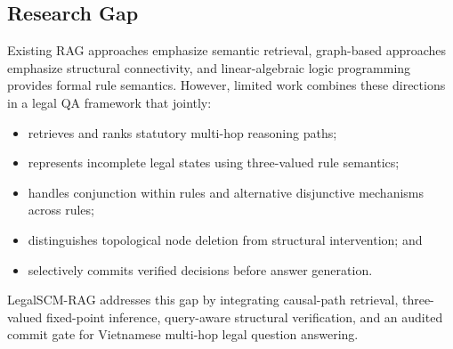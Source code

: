 \subsection{Research Gap}

Existing RAG approaches emphasize semantic retrieval, graph-based approaches
emphasize structural connectivity, and linear-algebraic logic programming
provides formal rule semantics. However, limited work combines these directions
in a legal QA framework that jointly:

\begin{itemize}
    \item retrieves and ranks statutory multi-hop reasoning paths;
    \item represents incomplete legal states using three-valued rule semantics;
    \item handles conjunction within rules and alternative disjunctive
    mechanisms across rules;
    \item distinguishes topological node deletion from structural intervention;
    and
    \item selectively commits verified decisions before answer generation.
\end{itemize}

LegalSCM-RAG addresses this gap by integrating causal-path retrieval,
three-valued fixed-point inference, query-aware structural verification, and an
audited commit gate for Vietnamese multi-hop legal question answering.
